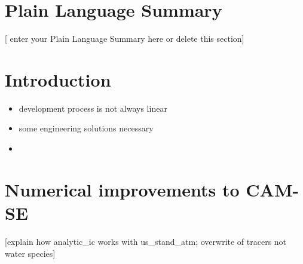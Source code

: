 \documentclass[draft]{agujournal2019}
\begin{document}
\section*{Plain Language Summary}
[ enter your Plain Language Summary here or delete this section]


%
%

\section{Introduction}
\begin{itemize}
\item development process is not always linear
\item some engineering solutions necessary
\item 
\end{itemize}
%


\section{Numerical improvements to CAM-SE}
[explain how analytic\_ic works with us\_stand\_atm; overwrite of tracers not water species]
\end{document}
